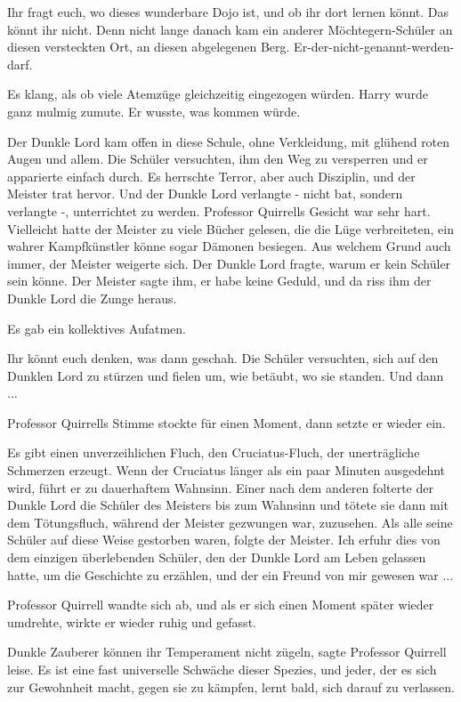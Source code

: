 \glqq{}Ihr fragt euch, wo dieses wunderbare Dojo ist, und ob ihr dort lernen
könnt. Das könnt ihr nicht. Denn nicht lange danach kam ein anderer
Möchtegern-Schüler an diesen versteckten Ort, an diesen abgelegenen Berg.
Er-der-nicht-genannt-werden-darf.\grqq{}

Es klang, als ob viele Atemzüge gleichzeitig eingezogen würden. Harry wurde ganz
mulmig zumute. Er wusste, was kommen würde.

\glqq{}Der Dunkle Lord kam offen in diese Schule, ohne Verkleidung, mit glühend
roten Augen und allem. Die Schüler versuchten, ihm den Weg zu versperren und er
apparierte einfach durch. Es herrschte Terror, aber auch Disziplin, und der
Meister trat hervor. Und der Dunkle Lord verlangte - nicht bat, sondern
verlangte -, unterrichtet zu werden.\grqq{} Professor Quirrells Gesicht war sehr
hart. \glqq{}Vielleicht hatte der Meister zu viele Bücher gelesen, die die Lüge
verbreiteten, ein wahrer Kampfkünstler könne sogar Dämonen besiegen. Aus welchem
Grund auch immer, der Meister weigerte sich. Der Dunkle Lord fragte, warum er
kein Schüler sein könne. Der Meister sagte ihm, er habe keine Geduld, und da
riss ihm der Dunkle Lord die Zunge heraus.\grqq{}

Es gab ein kollektives Aufatmen.

\glqq{}Ihr könnt euch denken, was dann geschah. Die Schüler versuchten, sich auf
den Dunklen Lord zu stürzen und fielen um, wie betäubt, wo sie standen. Und
dann ...\grqq{}

Professor Quirrells Stimme stockte für einen Moment, dann setzte er wieder ein.

\glqq{}Es gibt einen unverzeihlichen Fluch, den Cruciatus-Fluch, der
unerträgliche Schmerzen erzeugt. Wenn der Cruciatus länger als ein paar Minuten
ausgedehnt wird, führt er zu dauerhaftem Wahnsinn. Einer nach dem anderen
folterte der Dunkle Lord die Schüler des Meisters bis zum Wahnsinn und tötete
sie dann mit dem Tötungsfluch, während der Meister gezwungen war, zuzusehen. Als
alle seine Schüler auf diese Weise gestorben waren, folgte der Meister. Ich
erfuhr dies von dem einzigen überlebenden Schüler, den der Dunkle Lord am Leben
gelassen hatte, um die Geschichte zu erzählen, und der ein Freund von mir
gewesen war ...\grqq{}

Professor Quirrell wandte sich ab, und als er sich einen Moment später wieder
umdrehte, wirkte er wieder ruhig und gefasst.

\glqq{}Dunkle Zauberer können ihr Temperament nicht zügeln\grqq{}, sagte
Professor Quirrell leise. \glqq{}Es ist eine fast universelle Schwäche dieser
Spezies, und jeder, der es sich zur Gewohnheit macht, gegen sie zu kämpfen,
lernt bald, sich darauf zu verlassen.

